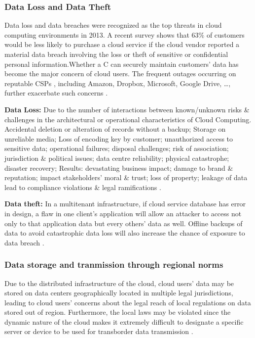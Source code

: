 \documentclass[twocolumn]{article}
\begin{document}
\subsubsection{Data Loss and Data Theft} 
Data loss and data breaches were recognized as the top threats in cloud computing environments in 2013. A recent survey shows that 63\% of customers would be less likely to purchase a cloud service if the cloud vendor reported a material data breach involving the loss or theft of sensitive or confidential personal information.Whether a C can securely maintain customers’ data has become the major concern of cloud users. The frequent outages occurring on reputable CSPs , including Amazon, Dropbox, Microsoft, Google Drive, \dots, further exacerbate such concerns \cite{liu2015survey}.


\textbf{Data Loss:} Due to the number of interactions between known/unknown risks \& challenges in the architectural or operational characteristics of Cloud Computing. Accidental deletion or alteration of records without a backup; Storage on unreliable media; Loss of encoding key by customer; unauthorized access to sensitive data; operational failures; disposal challenges; risk of association; jurisdiction \& political issues; data centre reliability; physical catastrophe; disaster recovery; Results: devastating business impact; damage to brand \& reputation; impact stakeholders’ moral \& trust; loss of property; leakage of data lead to compliance violations \& legal ramifications  \cite{ahmad2017cloud}.


\textbf{Data theft:} In a multitenant infrastructure, if cloud service database has error in design, a flaw in one client’s application will allow an attacker to access not only to that application data but every others’ data as well. Offline backups of data to avoid catastrophic data loss will also increase the chance of exposure to data breach \cite{ahmad2017cloud}.

\subsubsection{Data  storage and tranmission through regional norms} 
Due to the distributed infrastructure of the cloud, cloud users’ data may be stored on data centers geographically located in multiple legal jurisdictions, leading to cloud users’ concerns about the legal reach of local regulations on data stored out of region. Furthermore, the local laws may be violated since the dynamic nature of the cloud makes it extremely difficult to designate a specific server or device to be used for transborder data transmission \cite{liu2015survey}.
\end{document}
